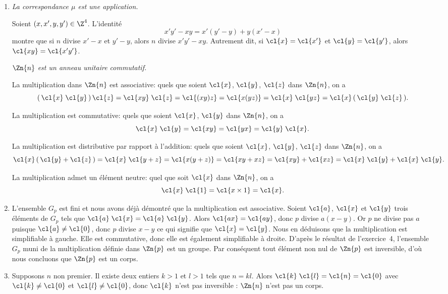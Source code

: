 \begin{enumerate}
  \item
    \emph{La correspondance $\mu$ est une application.} 

    Soient $(x,x',y,y')\in\Z^4$. 
    L'identité
    \[
      x'y' - xy = x'(y' - y) + y(x' - x)
    \]
    montre que si $n$ divise $x' - x$ et $y' - y$, alors $n$ divise $x'y' - xy$. 
    Autrement dit, si $\cl{x} = \cl{x'}$ et $\cl{y} = \cl{y'}$, alors $\cl{xy} = \cl{x'y'}$.

    \emph{$\Zn{n}$ est un anneau unitaire commutatif.}

    La multiplication dans $\Zn{n}$ est associative: quels que soient $\cl{x}$, $\cl{y}$, $\cl{z}$ dans $\Zn{n}$, on a
    \[
      (\,\cl{x}\;\cl{y}\,)\,\cl{z} 
        = \cl{xy}\;\cl{z}
        = \cl{(xy)z}
        = \cl{x(yz)}
        = \cl{x}\;\cl{yz}
        = \cl{x}\,(\,\cl{y}\;\cl{z}\,).
    \]

    La multiplication est commutative: quels que soient $\cl{x}$, $\cl{y}$ dans $\Zn{n}$, on a
    \[
      \cl{x}\;\cl{y} = \cl{xy} = \cl{yx} = \cl{y}\;\cl{x}.
    \]

    La multiplication est distributive par rapport à l'addition: quels que soient $\cl{x}$, $\cl{y}$, $\cl{z}$ dans $\Zn{n}$, on a
    \[
      \cl{x}\,(\,\cl{y} + \cl{z}\,)
        = \cl{x}\;\cl{y + z}
        = \cl{x(y + z)}
        = \cl{xy + xz}
        = \cl{xy} + \cl{xz}
        = \cl{x}\;\cl{y} + \cl{x}\;\cl{y}.
    \]

    La multiplication admet un élément neutre: quel que soit $\cl{x}$ dans $\Zn{n}$, on a
    \[
      \cl{x}\;\cl{1} = \cl{x\times 1} = \cl{x}.
    \]

  \item
    L'ensemble $G_p$ est fini et nous avons déjà démontré que la multiplication est associative.
    Soient $\cl{a}$, $\cl{x}$ et $\cl{y}$ trois éléments de $G_p$ tels que $\cl{a}\;\cl{x} = \cl{a}\;\cl{y}$. 
    Alors $\cl{ax} = \cl{ay}$, donc $p$ divise $a(x-y)$.
    Or $p$ ne divise pas $a$ puisque $\cl{a}\neq\cl{0}$, donc $p$ divise $x - y$ ce qui signifie que $\cl{x} = \cl{y}$.
    Nous en déduisons que la multiplication est simplifiable à gauche. 
    Elle est commutative, donc elle est également simplifiable à droite.
    D'après le résultat de l'exercice~4, l'ensemble $G_p$ muni de la multiplication définie dans $\Zn{p}$ est un groupe.
    Par conséquent tout élément non nul de $\Zn{p}$ est inversible, d'où nous concluons que $\Zn{p}$ est un corps.

  \item
    Supposons $n$ non premier. 
    Il existe deux entiers $k > 1$ et $l > 1$ tels que $n = kl$. 
    Alors $\cl{k}\;\cl{l} = \cl{n} = \cl{0}$  avec $\cl{k}\neq \cl{0}$ et $\cl{l}\neq \cl{0}$, donc $\cl{k}$ n'est pas inversible : $\Zn{n}$ n'est pas un corps.
\end{enumerate}
